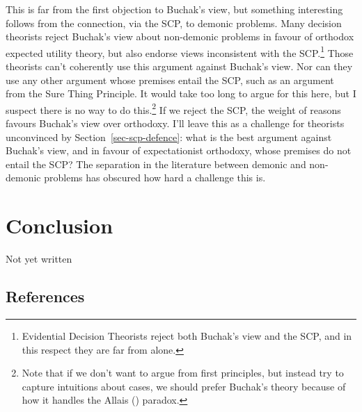 \documentclass[
  11pt,
  letterpaper,
  DIV=11,
  numbers=noendperiod,
  twoside]{scrartcl}
\begin{document}
This is far from the first objection to Buchak's view, but something
interesting follows from the connection, via the SCP, to demonic
problems. Many decision theorists reject Buchak's view about non-demonic
problems in favour of orthodox expected utility theory, but also endorse
views inconsistent with the SCP.\footnote{Evidential Decision Theorists
  reject both Buchak's view and the SCP, and in this respect they are
  far from alone.} Those theorists can't coherently use this argument
against Buchak's view. Nor can they use any other argument whose
premises entail the SCP, such as an argument from the Sure Thing
Principle. It would take too long to argue for this here, but I suspect
there is no way to do this.\footnote{Note that if we don't want to argue
  from first principles, but instead try to capture intuitions about
  cases, we should prefer Buchak's theory because of how it handles the
  Allais () paradox.} If we reject the
SCP, the weight of reasons favours Buchak's view over orthodoxy. I'll
leave this as a challenge for theorists unconvinced by
Section~\ref{sec-scp-defence}: what is the best argument against
Buchak's view, and in favour of expectationist orthodoxy, whose premises
do not entail the SCP? The separation in the literature between demonic
and non-demonic problems has obscured how hard a challenge this is.

\section{Conclusion}\label{sec-conclusion}

Not yet written

\subsection*{References}\label{references}
\end{document}
